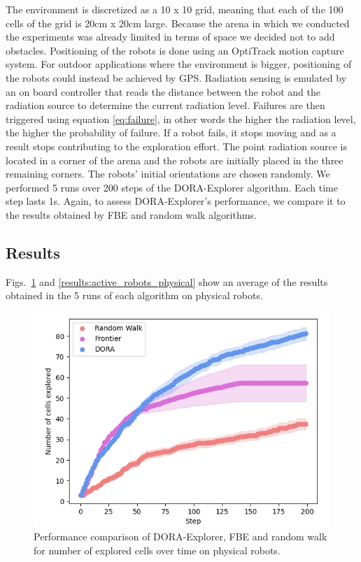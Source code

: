 \documentclass[letterpaper, 10 pt, conference]{ieeeconf}
\begin{document}
The environment is discretized as a 10 x 10 grid, meaning that each of
the 100 cells of the grid is 20cm x 20cm large. Because the arena in
which we conducted the experiments was already limited in terms of
space we decided not to add obstacles. 
Positioning of the
robots is done using an OptiTrack motion capture system. For outdoor
applications where the environment is bigger, positioning of the
robots could instead be achieved by GPS. Radiation sensing is emulated
by an on board controller that reads the distance between the robot
and the radiation source to determine the current radiation
level. Failures are then triggered using equation \eqref{eq:failure},
in other words the higher the radiation level, the higher the
probability of failure. If a robot fails, it stops moving and as a
result stops contributing to the exploration effort. The point
radiation source is located in a corner of the arena and the robots
are initially placed in the three remaining corners. The robots'
initial orientations are chosen randomly.  We performed 5 runs over
200 steps of the DORA-Explorer algorithm. Each time step lasts 1s. Again, to assess DORA-Explorer's
performance, we compare it to the results obtained by FBE and random
walk algorithms.


\subsection{Results}
Figs.~\ref{results:cells_explored_physical} and
\ref{results:active_robots_physical} show an average of the results
obtained in the 5 runs of each algorithm on physical robots.

\begin{figure}[h]
    \centering
    \includegraphics[width=0.95\columnwidth]{images/explored_real.png}
    \caption{Performance comparison of DORA-Explorer, FBE and random walk for number of explored cells over time on physical robots.}
    \label{results:cells_explored_physical}
\end{figure}
\end{document}
